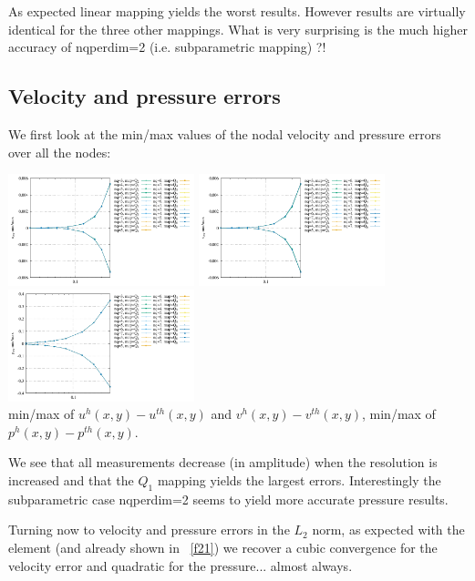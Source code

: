 As expected linear mapping yields the worst results. However results are virtually identical for 
the three other mappings.
What is very surprising is the much higher accuracy of {\python nqperdim=2} (i.e. subparametric mapping) ?!


\subsection*{Velocity and pressure errors}

We first look at the min/max values of the nodal velocity and pressure errors over all the nodes:
\begin{center}
\includegraphics[width=5.4cm]{python_codes/fieldstone_152/RESULTS/exp0/u_err}
\includegraphics[width=5.4cm]{python_codes/fieldstone_152/RESULTS/exp0/v_err}
\includegraphics[width=5.4cm]{python_codes/fieldstone_152/RESULTS/exp0/p_err}\\
{\captionfont min/max of $u^h(x,y)-u^{th}(x,y)$ and $v^h(x,y)-v^{th}(x,y)$, min/max of $p^h(x,y)-p^{th}(x,y)$.} 
\end{center}
We see that all measurements decrease (in amplitude) when the resolution is increased and that 
the $Q_1$ mapping yields the largest errors. 
Interestingly the subparametric case {\python nqperdim=2} seems to yield more accurate 
pressure results.

Turning now to velocity and pressure errors in the $L_2$ norm, 
as expected with the \QtwoQone element (and already shown in \stone~\ref{f21})
we recover a cubic convergence for the velocity error and quadratic for the 
pressure... almost always.

